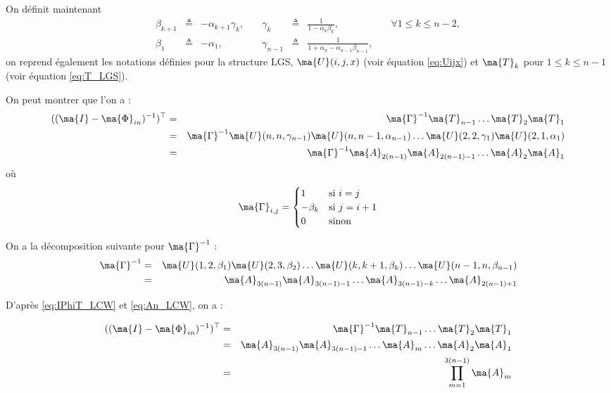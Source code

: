 On définit maintenant
\begin{equation*}
	\begin{array}{rclrclr}
		\beta_{k+1}&\triangleq& -\alpha_{k+1}\gamma_k, \quad &\gamma_k&\triangleq&\frac{1}{1-\alpha_k\beta_k}, &\quad \forall 1\leq k \leq n-2,\\
		\beta_1&\triangleq&-\alpha_1, \quad & \gamma_{n-1} &\triangleq& \frac{1}{1+\alpha_n-\alpha_{n-1}\beta_{n-1}},&
	\end{array}
\end{equation*}
on reprend également les notations définies pour la structure LGS, $\ma{U}(i,j,x)$ (voir équation \eqref{eq:Uijx}) et $\ma{T}_k$ pour $1\leq k\leq n-1$ (voir équation \eqref{eq:T_LGS}).

On peut montrer que l'on a :
\begin{eqnarray}
	((\ma{I}-\ma{\Phi}_{in})^{-1})^{\top} &=& \ma{\Gamma}^{-1}\ma{T}_{n-1} \ldots \ma{T}_2\ma{T}_1\nonumber\\
	 &=& \ma{\Gamma}^{-1}\ma{U}(n,n,\gamma_{n-1})\ma{U}(n,n-1,\alpha_{n-1})\ldots \ma{U}(2,2,\gamma_1)\ma{U}(2,1,\alpha_1)\nonumber\\
	 &=& \ma{\Gamma}^{-1}\ma{A}_{2(n-1)}\ma{A}_{2(n-1)-1} \ldots \ma{A}_{2}\ma{A}_{1}\label{eq:IPhiT_LCW}
\end{eqnarray}
où
\begin{equation*}
	\ma{\Gamma}_{i,j}=  
	\begin{cases}
		1 & \mbox{si}~i=j \\
		-\beta_k& \mbox{si}~j=i+1\\
		0 & \mbox{sinon}
	\end{cases}
\end{equation*}

On a la décomposition suivante pour $\ma{\Gamma}^{-1}$ :
\begin{eqnarray}
	\ma{\Gamma}^{-1} &=& \ma{U}(1,2,\beta_1)\ma{U}(2,3,\beta_2)\ldots \ma{U}(k,k+1,\beta_k)\ldots \ma{U}(n-1,n,\beta_{n-1})\nonumber\\
	 & = & \ma{A}_{3(n-1)}\ma{A}_{3(n-1)-1} \ldots \ma{A}_{3(n-1)-k} \ldots \ma{A}_{2(n-1)+1}\label{eq:An_LCW}
\end{eqnarray}

D'après \eqref{eq:IPhiT_LCW} et \eqref{eq:An_LCW}, on a :

\begin{eqnarray}
	((\ma{I}-\ma{\Phi}_{in})^{-1})^{\top} &=& \ma{\Gamma}^{-1}\ma{T}_{n-1} \ldots \ma{T}_2\ma{T}_1\nonumber\\
	  & = & \ma{A}_{3(n-1)}\ma{A}_{3(n-1)-1} \ldots \ma{A}_m \ldots \ma{A}_2\ma{A}_1\nonumber\\
	  & = & \prod_{m=1}^{3(n-1)}\ma{A}_m
\end{eqnarray}

